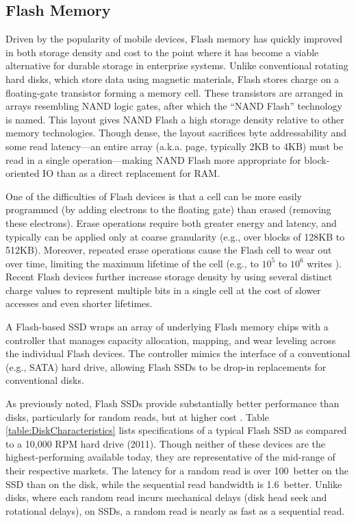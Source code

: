 \subsection{Flash Memory}
\label{sec:Background:Storage:Flash}
Driven by the popularity of mobile devices, Flash memory has quickly improved in both storage density and cost to the point where it has become a viable alternative for durable storage in enterprise systems.
Unlike conventional rotating hard disks, which store data using magnetic materials, Flash stores charge on a floating-gate transistor forming a memory cell.
These transistors are arranged in arrays resembling NAND logic gates, after which the ``NAND Flash'' technology is named.
This layout gives NAND Flash a high storage density relative to other memory technologies.
Though dense, the layout sacrifices byte addressability and some read latency---an entire array (a.k.a. page, typically 2KB to 4KB) must be read in a single operation---making NAND Flash more appropriate for block-oriented IO than as a direct replacement for RAM.  

One of the difficulties of Flash devices is that a cell can be more easily programmed (by adding electrons to the floating gate) than erased (removing these electrons).  
Erase operations require both greater energy and latency, and typically can be applied only at coarse granularity (e.g., over blocks of 128KB to 512KB).
Moreover, repeated erase operations cause the Flash cell to wear out over time, limiting the maximum lifetime of the cell (e.g., to $10^5$ to $10^6$ writes \cite{Roberts2009}).  
Recent Flash devices further increase storage density by using several distinct charge values to represent multiple bits in a single cell at the cost of slower accesses and even shorter lifetimes.

A Flash-based SSD wraps an array of underlying Flash memory chips with a controller that manages capacity allocation, mapping, and wear leveling across the individual Flash devices.  
The controller mimics the interface of a conventional (e.g., SATA) hard drive, allowing Flash SSDs to be drop-in replacements for conventional disks.
      
As previously noted, Flash SSDs provide substantially better performance than disks, particularly for random reads, but at higher cost \cite{BoboilaDesoyers11}.
Table \ref{table:DiskCharacteristics} lists specifications of a typical Flash SSD as compared to a 10,000 RPM hard drive (2011).
Though neither of these devices are the highest-performing available today, they are representative of the mid-range of their respective markets.
The latency for a random read is over 100\texttimes~better on the SSD than on the disk, while the sequential read bandwidth is 1.6\texttimes~better. 
Unlike disks, where each random read incurs mechanical delays (disk head seek and rotational delays), on SSDs, a random read is nearly as fast as a sequential read.  

